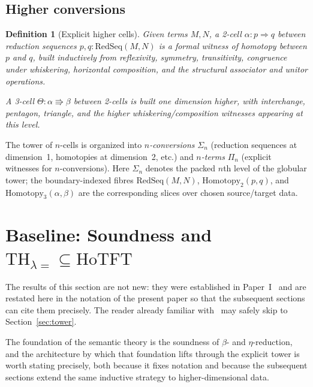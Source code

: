 \documentclass[webpdf,traditional,large,numbered]{oup-authoring-template}
\theoremstyle{thmstyleone}%
\theoremstyle{thmstyletwo}%
\theoremstyle{thmstylethree}%
\newtheorem{definition}[theorem]{Definition}
\newcommand{\THeq}{\mathrm{TH}_{\lambda =}}
\newcommand{\HoTFT}{\mathrm{HoTFT}}
\newcommand{\ReductionSeq}{\mathrm{RedSeq}}
\begin{document}
\subsection{Higher conversions}

\begin{definition}[Explicit higher cells]
  Given terms $M, N$, a \emph{2-cell} $\alpha: p \Rightarrow q$ between
  reduction sequences $p, q : \ReductionSeq(M,N)$ is a formal witness of
  homotopy between $p$ and $q$, built inductively from reflexivity, symmetry,
  transitivity, congruence under whiskering, horizontal composition, and the
  structural associator and unitor operations.

  A \emph{3-cell} $\Theta: \alpha \Rrightarrow \beta$ between 2-cells is built
  one dimension higher, with interchange, pentagon, triangle, and the higher
  whiskering/composition witnesses appearing at this level.
\end{definition}

The tower of $n$-cells is organized into \emph{$n$-conversions} $\Sigma_n$
(reduction sequences at dimension~1, homotopies at dimension~2, etc.) and
\emph{$n$-terms} $\Pi_n$ (explicit witnesses for $n$-conversions).
Here $\Sigma_n$ denotes the packed $n$th level of the globular tower; the
boundary-indexed fibres $\ReductionSeq(M,N)$, $\mathrm{Homotopy}_2(p,q)$, and
$\mathrm{Homotopy}_3(\alpha,\beta)$ are the corresponding slices over chosen
source/target data.

\section{Baseline: Soundness and \texorpdfstring{$\THeq \subseteq \HoTFT$}{TH\_lambda= subset HoTFT}}
\label{sec:baseline}

The results of this section are not new: they were established in
Paper~I~\cite{MRdQ:theory} and are restated here in the notation of the present
paper so that the subsequent sections can cite them precisely.  The reader
already familiar with~\cite{MRdQ:theory} may safely skip to
Section~\ref{sec:tower}.

\medskip
The foundation of the semantic theory is the soundness of $\beta$- and
$\eta$-reduction, and the architecture by which that foundation lifts through
the explicit tower is worth stating precisely, both because it fixes notation
and because the subsequent sections extend the same inductive strategy to
higher-dimensional data.
\end{document}
